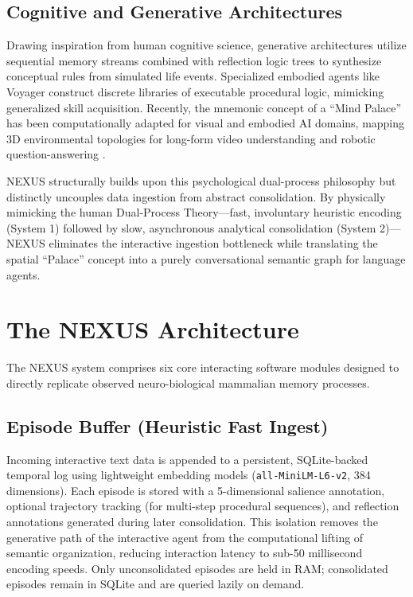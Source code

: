\documentclass[conference]{IEEEtran}
\begin{document}
\subsection{Cognitive and Generative Architectures}
Drawing inspiration from human cognitive science, generative architectures \cite{park2023generative} utilize sequential memory streams combined with reflection logic trees to synthesize conceptual rules from simulated life events. Specialized embodied agents like Voyager \cite{wang2023voyager} construct discrete libraries of executable procedural logic, mimicking generalized skill acquisition. Recently, the mnemonic concept of a ``Mind Palace'' has been computationally adapted for visual and embodied AI domains, mapping 3D environmental topologies for long-form video understanding and robotic question-answering \cite{wang2025mindpalace, ginting2025mindpalace}.

NEXUS structurally builds upon this psychological dual-process philosophy \cite{kahneman2011thinking} but distinctly uncouples data ingestion from abstract consolidation. By physically mimicking the human Dual-Process Theory---fast, involuntary heuristic encoding (System 1) followed by slow, asynchronous analytical consolidation (System 2)---NEXUS eliminates the interactive ingestion bottleneck while translating the spatial ``Palace'' concept into a purely conversational semantic graph for language agents.

\section{The NEXUS Architecture}

The NEXUS system comprises six core interacting software modules designed to directly replicate observed neuro-biological mammalian memory processes.

\subsection{Episode Buffer (Heuristic Fast Ingest)}
Incoming interactive text data is appended to a persistent, SQLite-backed temporal log using lightweight embedding models (\texttt{all-MiniLM-L6-v2}, 384 dimensions). Each episode is stored with a 5-dimensional salience annotation, optional trajectory tracking (for multi-step procedural sequences), and reflection annotations generated during later consolidation. This isolation removes the generative path of the interactive agent from the computational lifting of semantic organization, reducing interaction latency to sub-50 millisecond encoding speeds. Only unconsolidated episodes are held in RAM; consolidated episodes remain in SQLite and are queried lazily on demand.
\end{document}
